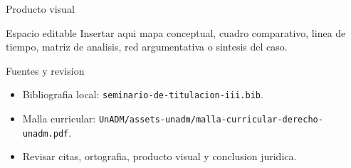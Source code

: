 \documentclass[
  spanish,
  aspectratio=169,
  xcolor={dvipsnames,table}
]{beamer}
\begin{document}
\begin{frame}{Producto visual}
  \begin{block}{Espacio editable}
    Insertar aqui mapa conceptual, cuadro comparativo, linea de tiempo,
    matriz de analisis, red argumentativa o sintesis del caso.
  \end{block}
  \centering
\end{frame}

\begin{frame}{Fuentes y revision}
  \begin{itemize}
    \item Bibliografia local: \texttt{seminario-de-titulacion-iii.bib}.
    \item Malla curricular: \texttt{UnADM/assets-unadm/malla-curricular-derecho-unadm.pdf}.
    \item Revisar citas, ortografia, producto visual y conclusion juridica.
  \end{itemize}
\end{frame}
\end{document}
